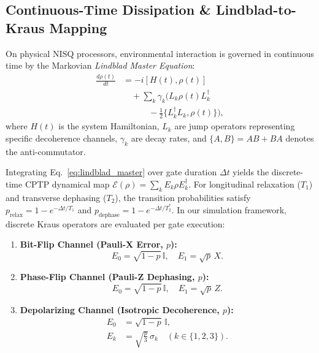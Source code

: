 \documentclass[journal]{IEEEtran}
\begin{document}
\subsection{Continuous-Time Dissipation \& Lindblad-to-Kraus Mapping}
On physical NISQ processors, environmental interaction is governed in continuous time by the Markovian \textit{Lindblad Master Equation}:
\begin{align}
\frac{d\rho(t)}{dt} &= -i [H(t), \rho(t)] \nonumber \\
&\quad + \sum_{k} \gamma_k \Big( L_k \rho(t) L_k^\dagger \nonumber \\
&\qquad\quad - \frac{1}{2} \{L_k^\dagger L_k, \rho(t)\} \Big),
\label{eq:lindblad_master}
\end{align}
where $H(t)$ is the system Hamiltonian, $L_k$ are jump operators representing specific decoherence channels, $\gamma_k$ are decay rates, and $\{A, B\} = AB + BA$ denotes the anti-commutator.

Integrating Eq.~\eqref{eq:lindblad_master} over gate duration $\Delta t$ yields the discrete-time CPTP dynamical map $\mathcal{E}(\rho) = \sum_k E_k \rho E_k^\dagger$. For longitudinal relaxation ($T_1$) and transverse dephasing ($T_2$), the transition probabilities satisfy $p_{\mathrm{relax}} = 1 - e^{-\Delta t / T_1}$ and $p_{\mathrm{dephase}} = 1 - e^{-\Delta t / T_2^*}$. In our simulation framework, discrete Kraus operators are evaluated per gate execution:
\begin{enumerate}
    \item \textbf{Bit-Flip Channel (Pauli-X Error, $p$):}
    \begin{equation}
    E_0 = \sqrt{1 - p} \, \mathbb{I}, \quad E_1 = \sqrt{p} \, X.
    \label{eq:kraus_bitflip}
    \end{equation}
    \item \textbf{Phase-Flip Channel (Pauli-Z Dephasing, $p$):}
    \begin{equation}
    E_0 = \sqrt{1 - p} \, \mathbb{I}, \quad E_1 = \sqrt{p} \, Z.
    \label{eq:kraus_phaseflip}
    \end{equation}
    \item \textbf{Depolarizing Channel (Isotropic Decoherence, $p$):}
    \begin{align}
    E_0 &= \sqrt{1 - p} \, \mathbb{I}, \nonumber \\
    E_k &= \sqrt{\frac{p}{3}} \, \sigma_k \quad (k \in \{1, 2, 3\}).
    \label{eq:kraus_depolarizing}
    \end{align}
\end{enumerate}
\end{document}
